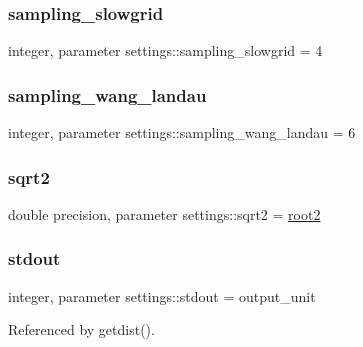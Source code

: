 \subsubsection{\texorpdfstring{sampling\+\_\+slowgrid}{sampling\_slowgrid}}
{\footnotesize\ttfamily integer, parameter settings\+::sampling\+\_\+slowgrid = 4}

\mbox{\label{namespacesettings_a88e45b9a2ab5447d2cb82b74672906de}} 
\subsubsection{\texorpdfstring{sampling\+\_\+wang\+\_\+landau}{sampling\_wang\_landau}}
{\footnotesize\ttfamily integer, parameter settings\+::sampling\+\_\+wang\+\_\+landau = 6}

\mbox{\label{namespacesettings_a46452645879c3ed6edc6b31e79786d63}} 
\subsubsection{\texorpdfstring{sqrt2}{sqrt2}}
{\footnotesize\ttfamily double precision, parameter settings\+::sqrt2 = \mbox{\hyperlink{namespacesettings_a54504c6d9151b9990bf3f15deeaa139b}{root2}}}

\mbox{\label{namespacesettings_af5b1a69ec3d96be977d23b1e59e7d36e}} 
\subsubsection{\texorpdfstring{stdout}{stdout}}
{\footnotesize\ttfamily integer, parameter settings\+::stdout = output\+\_\+unit}



Referenced by getdist().

\mbox{\label{namespacesettings_a4acafe693ea8cedb2044a2ce90c9469f}} 
